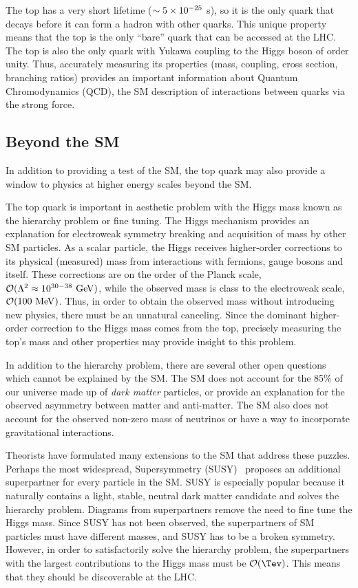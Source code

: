  The top has a very short lifetime ($\sim 5 \times 10^{-25}$ s), so it is the only quark that decays before it can form a hadron with other quarks. This unique property means that the top is the only ``bare'' quark that can be accessed at the LHC. The top is also the only quark with Yukawa coupling to the Higgs boson of order unity. Thus, accurately measuring its properties (mass, coupling, cross section, branching ratios) provides an important information about Quantum Chromodynamics (QCD), the SM description of interactions between quarks via the strong force. 

\subsection{Beyond the SM}
In addition to providing a test of the SM, the top quark may also provide a window to physics at higher energy scales beyond the SM.

The top quark is important in aesthetic problem with the Higgs mass known as the hierarchy problem or fine tuning. The Higgs mechanism provides an explanation for electroweak symmetry breaking and acquisition of mass by other SM particles. As a scalar particle, the Higgs receives higher-order corrections to its physical (measured) mass from interactions with fermions, gauge bosons and itself. These corrections are on the order of the Planck scale, $\mathcal{O}(\Lambda^2 \approx 10^{30-38} \gev)$, while the observed mass is class to the electroweak scale, $\mathcal{O}(100 \mev)$. Thus, in order to obtain the observed mass without introducing new physics, there must be an unnatural canceling. Since the dominant higher-order correction to the Higgs mass comes from the top, precisely measuring the top's mass and other properties may provide insight to this problem. 

In addition to the hierarchy problem, there are several other open questions which cannot be explained by the SM. The SM does not account for the 85\% of our universe made up of \textit{dark matter} particles, or provide an explanation for the observed asymmetry between matter and anti-matter. The SM also does not account for the observed non-zero mass of neutrinos or have a way to incorporate gravitational interactions.

Theorists have formulated many extensions to the SM that address these puzzles. Perhaps the most widespread, Supersymmetry (SUSY)~\cite{susy} proposes an additional superpartner for every particle in the SM. SUSY is especially popular because it naturally contains a light, stable, neutral dark matter candidate and solves the hierarchy problem. Diagrams from superpartners remove the need to fine tune the Higgs mass. Since SUSY has not been observed, the superpartners of SM particles must have different masses, and SUSY has to be a broken symmetry. However, in order to satisfactorily solve the hierarchy problem, the superpartners with the largest contributions to the Higgs mass must be $\mathcal{O}(\Tev)$. This means that they should be discoverable at the LHC.

